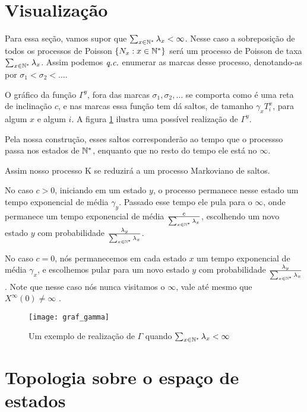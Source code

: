 \section{Visualização}
\label{sec:visualizacao}

Para essa seção, vamos supor que $\sum_{x \in {\mathbb{N^*}}} \lambda_x <
\infty$. Nesse caso a sobreposição de todos os processos de Poisson
$\{N_x : x \in {\mathbb{N^*}}\}$ será um processo de Poisson de taxa $\sum_{x \in
  {\mathbb{N^*}}} \lambda_x$. Assim podemos ${\emph{q.c.}}$ enumerar as marcas desse
processo, denotando-as por $ \sigma_1 < \sigma_2 < \ldots$.

O gráfico da função $\Gamma^y$, fora das marcas $\sigma_1, \sigma_2,
\ldots$ se comporta como é uma reta de inclinação $c$, e nas marcas
essa função tem dá saltos, de tamanho $\gamma_x T^x_i$, para algum $x$
e algum $i$. A figura \ref{fig:graf_gamma} ilustra uma possível
realização de $\Gamma^y$.


Pela nossa construção, esses saltos corresponderão ao tempo que o
processso passa nos estados de ${\mathbb{N^*}}$, enquanto que no resto do tempo
ele está no $\infty$.

Assim nosso processo K se reduzirá a um processo Markoviano de
saltos.

No caso $c > 0$, iniciando em um estado $y$, o processo permanece
nesse estado um tempo exponencial de média $\gamma_y$. Passado esse
tempo ele pula para o $\infty$, onde permanece um tempo exponencial de
média $\frac{c}{\sum_{x \in {\mathbb{N^*}}} \lambda_x}$, escolhendo um novo
estado $y$ com probabilidade $\frac{\lambda_y}{\sum_{x \in {\mathbb{N^*}}}
  \lambda_x}$.

No caso $c=0$, nós permanecemos em cada estado $x$ um tempo
exponencial de média $\gamma_x$, e escolhemos pular para um novo estado $y$
com probabilidade $\frac{\lambda_y}{\sum_{x \in {\mathbb{N^*}}} \lambda_x}$.
Note que nesse caso nós nunca visitamos o $\infty$, vale até mesmo que
$X^\infty(0) \neq \infty$ \qc.


\begin{figure}
  \centering
  \texttt{[image: graf\_gamma]}
  \caption{Um exemplo de realização de $\Gamma$ quando $\sum_{x \in
      {\mathbb{N^*}}} \lambda_x < \infty$}
  \label{fig:graf_gamma}
\end{figure}

\section{Topologia sobre o espaço de estados}
\label{sec:topologia}

